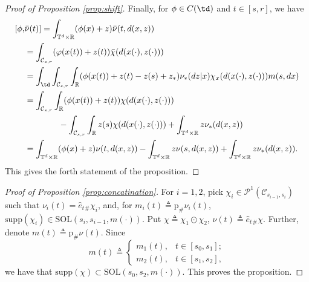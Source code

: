 \documentclass[a4paper,12pt]{article}
\newcommand{\tdr}{\mathbb{T}^{d}\times\mathbb{R}}
\begin{document}
\begin{proof}[Proof of Proposition \ref{prop:shift}]
	Finally, for $\phi\in C(\td)$ and $t\in [s,r]$, we have
	\begin{equation*}
	\begin{split}
	[\phi,&\bar{\nu}(t)]=\int_{\tdr}(\phi(x)+z)\bar{\nu}(t,d(x,z))\\
	&=\int_{\mathcal{C}_{s,r}}(\varphi(x(t))+z(t))\bar{\chi}(d(x(\cdot),z(\cdot)))\\&= \int_{\td} \int_{\mathcal{C}_{s,r}}\int_{\mathbb{R}}(\phi(x(t))+z(t)-z(s)+z_*)\nu_*(dz|x)\chi_{x}(d(x(\cdot),z(\cdot)))m(s,dx)\\
	&=\int_{\mathcal{C}_{s,r}}\int_{\mathbb{R}}(\phi(x(t))+z(t))\chi(d(x(\cdot),z(\cdot)))\\
	&{}\hspace{40pt}-\int_{\mathcal{C}_{s,r}}\int_{\mathbb{R}}z(s)\chi(d(x(\cdot),z(\cdot)))+\int_{\tdr}z\nu_*(d(x,z))\\
	&=\int_{\tdr}(\phi(x)+z)\nu(t,d(x,z))-\int_{\tdr}z\nu(s,d(x,z))+\int_{\tdr}z\nu_*(d(x,z)).
	\end{split}
	\end{equation*} This gives the forth statement of the proposition. 
	
\end{proof}

\begin{proof}[Proof of Proposition \ref{prop:concatination}] For $i=1,2$, pick $\chi_i\in\mathcal{P}^1(\mathcal{C}_{s_{i-1},s_i})$ such that $\nu_i(t)=\hat{e}_t{}_\#\chi_i$, and, for $m_i(t)\triangleq \mathrm{p}_\#\nu_i(t)$, $\mathrm{supp}(\chi_i)\in\mathrm{SOL}(s_i,s_{i-1},m(\cdot))$. Put $\chi\triangleq \chi_1\odot\chi_2$, $\nu(t)\triangleq\hat{e}_t{}_\#\chi$. Further, denote $m(t)\triangleq \mathrm{p}_\#\nu(t)$. Since 	$$m(t)\triangleq \left\{\begin{array}{cc}
	m_1(t), & t\in [s_0,s_1];\\
	m_2(t), & t\in [s_1,s_2],
	\end{array}\right. $$ we have that $\mathrm{supp}(\chi)\subset\mathrm{SOL}(s_0,s_2,m(\cdot))$. This proves the proposition.
\end{proof}
\end{document}
